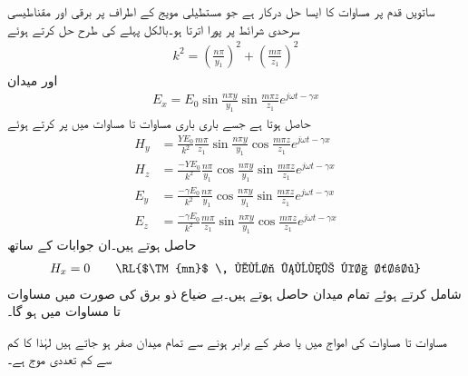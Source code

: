 ساتویں قدم پر مساوات  کا ایسا حل درکار ہے جو مستطیلی مویج کے اطراف پر برقی اور مقناطیسی سرحدی شرائط پر پورا اترتا ہو۔بالکل پہلے کی طرح حل کرتے ہوئے
\begin{align}\label{مساوات_مویج_عرضی_مقناطیسی_مستقل_قے_ب}
k^2=\left(\frac{n \pi}{y_1}\right)^2+\left(\frac{m \pi}{z_1}\right)^2
\end{align}
اور میدان
\begin{align}\label{مساوات_مویج_عرضی_مقناطیسی_حل_الف}
E_x=E_0 \sin \frac{n \pi y}{y_1} \sin \frac{m \pi z}{z_1} e^{j \omega t -\gamma x}
\end{align}
حاصل ہوتا ہے جسے باری باری مساوات  تا مساوات  میں پر کرتے ہوئے
\begin{align}
H_y&=\frac{Y E_0}{k^2} \frac{m \pi}{z_1}\sin \frac{n \pi y}{y_1} \cos \frac{m \pi z}{z_1} e^{j \omega t -\gamma x} \label{مساوات_مویج_عرضی_مقناطیسی_حل_ب}\\
H_z&=\frac{-Y E_0}{k^2} \frac{n\pi}{y_1}\cos \frac{n \pi y}{y_1} \sin \frac{m \pi z}{z_1} e^{j \omega t -\gamma x} \label{مساوات_مویج_عرضی_مقناطیسی_حل_پ}\\
E_y&=\frac{-\gamma E_0}{k^2}\frac{n\pi}{y_1}\cos \frac{n \pi y}{y_1} \sin \frac{m \pi z}{z_1} e^{j \omega t -\gamma x} \label{مساوات_مویج_عرضی_مقناطیسی_حل_ت}\\
E_z&=\frac{-\gamma E_0}{k^2} \frac{m \pi}{z_1}\sin \frac{n \pi y}{y_1} \cos \frac{m \pi z}{z_1} e^{j \omega t -\gamma x}\label{مساوات_مویج_عرضی_مقناطیسی_حل_ٹ}
\end{align}
حاصل ہوتے ہیں۔ان جوابات کے ساتھ
\begin{align}\label{مساوات_مویج_عرضی_مقناطیسی_حل_ث}
H_x=0  \quad \quad \text{\RL{$\TM{mn}$ \, موج ہونے کا شرط}} 
\end{align}
شامل کرتے ہوئے تمام میدان حاصل ہوتے ہیں۔بے ضیاع ذو برق  کی صورت میں مساوات  تا مساوات  میں  ہو  گا۔

مساوات  تا مساوات  کی  امواج  میں  یا  صفر کے برابر ہونے سے تمام میدان صفر ہو جاتے ہیں لہٰذا  کا کم سے کم تعددی موج  ہے۔


